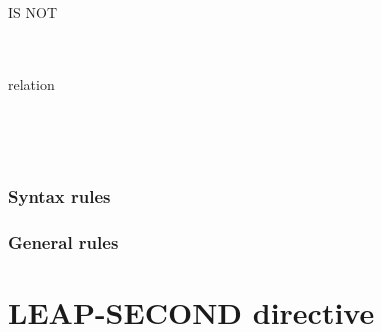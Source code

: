 \begin{syntax}
  \begin{1=}
    \directiveindicator \\
    \miscext{\textdollar}
  \end{1=}
    IS NOT
  \begin{1=}
     \\
     \\
    relation \\
  \end{1=}

  \sourcetext


  \begin{0-1}
    \begin{1=}
      \directiveindicator \\
      \miscext{\textdollar}
    \end{1=}
     \sourcetext
  \end{0-1}

  \begin{0-1}
    \directiveindicator{} \\
  \end{0-1}
\end{syntax}

\subsubsection{Syntax rules}

\subsubsection{General rules}

\section{LEAP-SECOND directive}

